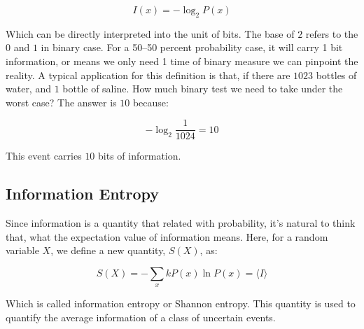 \documentclass[../main.tex]{subfiles}
\begin{document}
\begin{equation}
    I(x) = -\log_2 P(x)
\end{equation}

Which can be directly interpreted into the unit of bits. The base of $2$ refers to the $0$ and $1$ in binary case. For a 50--50 percent probability case, it will carry 1 bit information, or means we only need 1 time of binary measure we can pinpoint the reality. A typical application for this definition is that, if there are $1023$ bottles of water, and $1$ bottle of saline. How much binary test we need to take under the worst case? The answer is $10$ because:

\begin{equation}
    -\log_2 \frac{1}{1024} = 10
\end{equation}

This event carries $10$ bits of information.

\subsection{Information Entropy}

Since information is a quantity that related with probability, it's natural to think that, what the expectation value of information means. Here, for a random variable $X$, we define a new quantity, $S(X)$, as:

\begin{equation}
    S(X) = -\sum_{x} k P(x)\ln P(x) = \langle I\rangle
\end{equation}

Which is called information entropy or Shannon entropy. This quantity is used to quantify the average information of a class of uncertain events.
\end{document}
